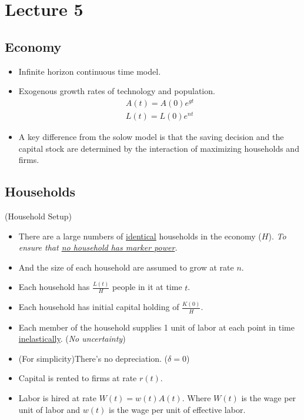 \documentclass[]{article}
\begin{document}
	\section{Lecture 5}
	\subsection{Economy}
	\begin{itemize}
		\item Infinite horizon continuous time model.
		\item Exogenous growth rates of technology and population.
		\begin{gather*}
			A(t) = A(0) e^{gt} \\
			L(t) = L(0) e^{nt}
		\end{gather*}
		\item A key difference from the solow model is that the saving decision and the capital stock are determined by the interaction of maximizing households and firms.
	\end{itemize}
	
	\subsection{Households}
	\begin{assumption}(Household Setup)
		\begin{itemize}
			\item There are a large numbers of \ul{identical} households in the economy ($H$). \emph{To ensure that \ul{no household has marker power}.}
			\item And the size of each household are assumed to grow at rate $n$.
			\item Each household has $\frac{L(t)}{H}$ people in it at time $t$.
			\item Each household has initial capital holding of $\frac{K(0)}{H}$.
			\item Each member of the household supplies 1 unit of labor at each point in time \ul{inelastically}. (\emph{No uncertainty})
			\item (For simplicity)There's no depreciation. ($\delta = 0$)
			\item Capital is rented to firms at rate $r(t)$.
			\item Labor is hired at rate $W(t) = w(t)A(t)$. Where $W(t)$ is the wage per unit of labor and $w(t)$ is the wage per unit of effective labor.
		\end{itemize}
	\end{assumption}
	
\end{document}
